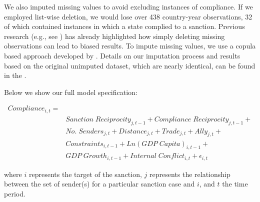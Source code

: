 We also imputed missing values to avoid excluding instances of compliance. If we employed list-wise deletion, we would lose over 438 country-year observations, 32 of which contained instances in which a state complied to a sanction. Previous research (e.g., see \citealp{rubin1976inference,honaker2010missing}) has already highlighted how simply deleting missing observations can lead to biased results. To impute missing values, we use a copula based approach developed by \citet{hoff:2007}. Details on our imputation process and results based on the original unimputed dataset, which are nearly identical, can be found in the . 

Below we show our full model specification: 

\begin{align*}
		Compliance_{i,t} =& \\
		&Sanction \; Reciprocity_{j,t-1} + Compliance \; Reciprocity_{j,t-1} + \\
		&No. \; Senders_{j,t} + Distance_{j,t} + Trade_{j,t} + Ally_{j,t} + \\
		&Constraints_{i,t-1} + Ln(GDP \; Capita)_{i,t-1} +\\
		&GDP \; Growth_{i,t-1} + Internal \; Conflict_{i,t} + \epsilon_{i,t}
\end{align*}

where $i$ represents the target of the sanction, $j$ represents the relationship between the set of sender(s) for a particular sanction case and $i$, and $t$ the time period.